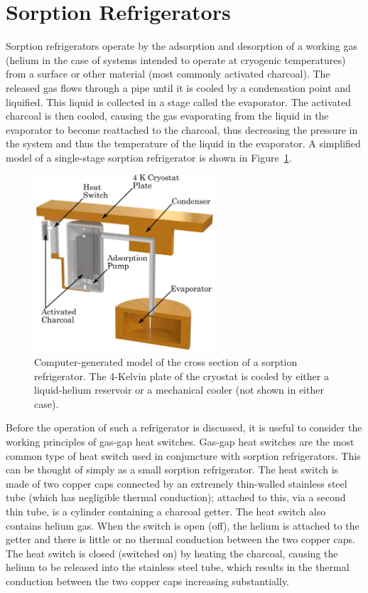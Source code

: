 \section{Sorption Refrigerators}\label{sec:sorptionRefrigerators}
Sorption refrigerators operate by the adsorption and desorption of a working gas (helium in the case of systems intended to operate at cryogenic temperatures) from a surface or other material (most commonly activated charcoal). The released gas flows through a pipe until it is cooled by a condensation point and liquified. This liquid is collected in a stage called the evaporator. The activated charcoal is then cooled, causing the gas evaporating from the liquid in the evaporator to become reattached to the charcoal, thus decreasing the pressure in the system and thus the temperature of the liquid in the evaporator. A simplified model of a single-stage sorption refrigerator is shown in Figure~\ref{fig:sorptionPumpCrossSec}.
\begin{figure}[tb]
\begin{center}
\includegraphics[width = 0.6\textwidth]{figures/sorptionPump}
\caption[Simplified model of the cross section of a sorption refrigerator]{Computer-generated model of the cross section of a sorption refrigerator. The 4-Kelvin plate of the cryostat is cooled by either a liquid-helium reservoir or a mechanical cooler (not shown in either case).}
\label{fig:sorptionPumpCrossSec}
\end{center}
\end{figure}
\par
Before the operation of such a refrigerator is discussed, it is useful to consider the working principles of gas-gap heat switches. Gas-gap heat switches are the most common type of heat switch used in conjuncture with sorption refrigerators. This can be thought of simply as a small sorption refrigerator. The heat switch is made of two copper caps connected by an extremely thin-walled stainless steel tube (which has negligible thermal conduction); attached to this, via a second thin tube, is a cylinder containing a charcoal getter. The heat switch also contains helium gas. When the switch is open (off), the helium is attached to the getter and there is little or no thermal conduction between the two copper caps. The heat switch is closed (switched on) by heating the charcoal, causing the helium to be released into the stainless steel tube, which results in the thermal conduction between the two copper caps increasing substantially.
